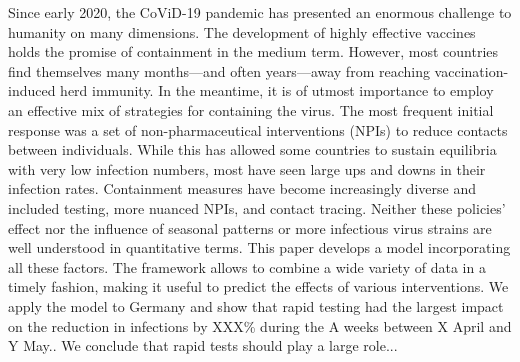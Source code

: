 



Since early 2020, the CoViD-19 pandemic has presented an enormous challenge to humanity
on many dimensions. The development of highly effective vaccines holds the promise of
containment in the medium term. However, most countries find themselves many months---and
often years---away from reaching vaccination-induced herd immunity. In the meantime, it is of utmost
importance to employ an effective mix of strategies for containing the virus. The most
frequent initial response was a set of non-pharmaceutical interventions (NPIs) to reduce
contacts between individuals. While this has allowed some countries to sustain equilibria
with very low infection numbers, most have
seen large ups and downs in their infection rates. Containment measures have become
increasingly diverse and included testing, more nuanced NPIs, and contact tracing.
Neither these policies' effect nor the influence of seasonal patterns or more infectious
virus strains are well understood in quantitative terms. This paper develops a model
incorporating all these factors. The framework allows to combine a wide variety of data
in a timely fashion, making it useful to predict the effects of various interventions. We
apply the model to Germany and show that rapid testing had the largest impact on the
reduction in infections by XXX\% during the A weeks between X April and Y
May.. We conclude that rapid tests should play
a large role...

